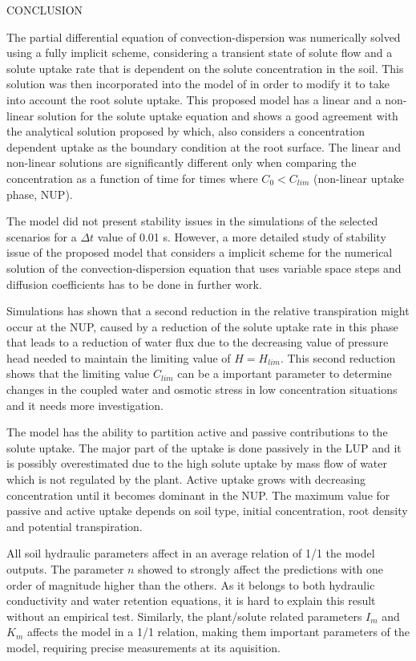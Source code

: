 \cleardoublepage
\chap CONCLUSION

The partial differential equation of convection-dispersion was numerically solved using a fully implicit scheme, considering a transient state of solute flow and a solute uptake rate that is dependent on the solute concentration in the soil.
This solution was then incorporated into the model of \citeonline[liersolute] in order to modify it to take into account the root solute uptake.
This proposed model has a linear and a non-linear solution for the solute uptake equation and shows a good agreement with the analytical solution proposed by \citeonline[cushman] which, also considers a concentration dependent uptake as the boundary condition at the root surface.
The linear and non-linear solutions are significantly different only when comparing the concentration as a function of time for times where $C_0 < C_{lim}$ (non-linear uptake phase, NUP).

{\tblue The model did not present stability issues in the simulations of the selected scenarios for a $\Delta t$ value of 0.01 s.
However, a more detailed study of stability issue of the proposed model that considers a implicit scheme for the numerical solution of the convection-dispersion equation that uses variable space steps and diffusion coefficients has to be done in further work.
}

Simulations has shown that a second reduction in the relative transpiration might occur at the NUP, caused by a reduction of the solute uptake rate in this phase that leads to a reduction of water flux due to the decreasing value of pressure head needed to maintain the limiting value of $H=H_{lim}$.
This second reduction shows that the limiting value $C_{lim}$ can be a important parameter to determine changes in the coupled water and osmotic stress in low concentration situations and it needs more investigation.

The model has the ability to partition active and passive contributions to the solute uptake.
The major part of the uptake is done passively  in the LUP and it is possibly overestimated due to the high solute uptake by mass flow of water which is not regulated by the plant. 
Active uptake grows with decreasing concentration until it becomes dominant in the NUP.
The maximum value for passive and active uptake depends on soil type, initial concentration, root density and potential transpiration.

All soil hydraulic parameters affect in an average relation of 1/1 the model outputs.
The parameter $n$ showed to strongly affect the predictions with one order of magnitude higher than the others.
As it belongs to both hydraulic conductivity and water retention equations, it is hard to explain this result without an empirical test.
Similarly, the plant/solute related parameters $I_m$ and $K_m$ affects the model in a 1/1 relation, making them important parameters of the model, requiring precise measurements at its aquisition.

